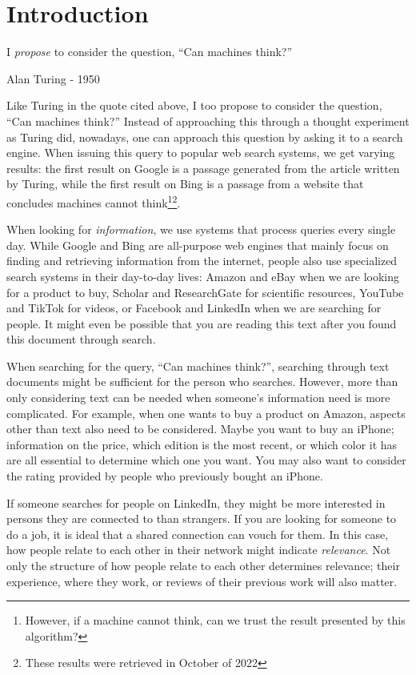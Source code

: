 \chapter{Introduction}
\label{chp:introduction}
\epigraph{I \textit{propose} to consider the question, ``Can machines think?''}{Alan Turing - 1950}

Like Turing in the quote cited above, I too propose to consider the question, ``Can machines think?'' Instead of approaching this through a thought experiment as Turing did, nowadays, one can approach this question by asking it to a search engine. When issuing this query to popular web search systems, we get varying results: the first result on Google is a passage generated from the article written by Turing, while the first result on Bing is a passage from a website that concludes machines cannot think\footnote{However, if a machine cannot think, can we trust the result presented by this algorithm?}\footnote{These results were retrieved in October of 2022}.

When looking for \textit{information}, we use systems that process queries every single day. While Google and Bing are all-purpose web engines that mainly focus on finding and retrieving information from the internet, people also use specialized search systems in their day-to-day lives: Amazon and eBay when we are looking for a product to buy, Scholar and ResearchGate for scientific resources, YouTube and TikTok for videos, or Facebook and LinkedIn when we are searching for people. It might even be possible that you are reading this text after you found this document through search. 

When searching for the query, ``Can machines think?'', searching through text documents might be sufficient for the person who searches. However, more than only considering text can be needed when someone's information need is more complicated. For example, when one wants to buy a product on Amazon, aspects other than text also need to be considered. Maybe you want to buy an iPhone; information on the price, which edition is the most recent, or which color it has are all essential to determine which one you want. You may also want to consider the rating provided by people who previously bought an iPhone.

If someone searches for people on LinkedIn, they might be more interested in persons they are connected to than strangers. If you are looking for someone to do a job, it is ideal that a shared connection can vouch for them. In this case, how people relate to each other in their network might indicate \textit{relevance}. Not only the structure of how people relate to each other determines relevance; their experience, where they work, or reviews of their previous work will also matter.

